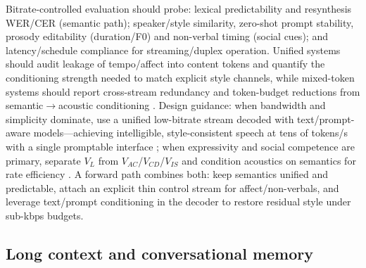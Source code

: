 \documentclass{article}
\begin{document}
Bitrate-controlled evaluation should probe: lexical predictability and resynthesis WER/CER (semantic path); speaker/style similarity, zero-shot prompt stability, prosody editability (duration/F0) and non-verbal timing (social cues); and latency/schedule compliance for streaming/duplex operation. Unified systems should audit leakage of tempo/affect into content tokens and quantify the conditioning strength needed to match explicit style channels, while mixed-token systems should report cross-stream redundancy and token-budget reductions from semantic$\rightarrow$acoustic conditioning \cite{yang2025diffsoundstreamefficientspeechtokenizati}. Design guidance: when bandwidth and simplicity dominate, use a unified low-bitrate stream decoded with text/prompt-aware models---achieving intelligible, style-consistent speech at tens of tokens/s with a single promptable interface \cite{zhang2024speechtokenizerunifiedspeechtokenizerlar,wang2025dualspeechlmtowardsunifiedspeechundersta,yang2025diffsoundstreamefficientspeechtokenizati,zhao2024textlessstreamingspeechtranslationsemant,jiang2025universalspeechtokenlearninglowbitratene}; when expressivity and social competence are primary, separate $V_{L}$ from $V_{AC}$/$V_{CD}$/$V_{IS}$ and condition acoustics on semantics for rate efficiency \cite{yang2025diffsoundstreamefficientspeechtokenizati,wang2025bossbeyondsemanticspeech}. A forward path combines both: keep semantics unified and predictable, attach an explicit thin control stream for affect/non-verbals, and leverage text/prompt conditioning in the decoder to restore residual style under sub-kbps budgets.

\subsection{Long context and conversational memory} \label{subsec:Long context and conversational memory}
\end{document}
